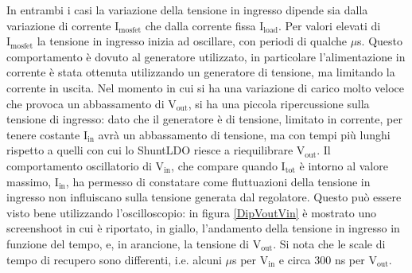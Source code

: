 In entrambi i casi la variazione della tensione in ingresso dipende sia dalla variazione di corrente $\mathrm{I_{mosfet}}$ che dalla corrente fissa $\mathrm{I_{load}}$. 
Per valori elevati di $\mathrm{I_{mosfet}}$ la tensione in ingresso inizia ad oscillare, con periodi di qualche $\mu$s.
Questo comportamento è dovuto al generatore utilizzato, in particolare l'alimentazione in corrente è stata ottenuta utilizzando un generatore di tensione, ma limitando la corrente in uscita. 
Nel momento in cui si ha una variazione di carico molto veloce che provoca un abbassamento di $\mathrm{V_{out}}$, si ha una piccola ripercussione sulla tensione di ingresso: dato che il generatore è di tensione, limitato in corrente, per tenere costante $\mathrm{I_{in}}$ avrà un abbassamento di tensione, ma con tempi più lunghi rispetto a quelli con cui lo ShuntLDO riesce a riequilibrare $\mathrm{V_{out}}$.
Il comportamento oscillatorio di $\mathrm{V_{in}}$, che compare quando $\mathrm{I_{tot}}$ è intorno al valore massimo, $\mathrm{I_{in}}$, ha permesso di constatare come fluttuazioni della tensione in ingresso non influiscano sulla tensione generata dal regolatore.
Questo può essere visto bene utilizzando l'oscilloscopio: in figura \ref{DipVoutVin} è mostrato uno screenshoot in cui è riportato, in giallo, l'andamento della tensione in ingresso in funzione del tempo, e, in arancione, la tensione di $\mathrm{V_{out}}$.
Si nota che le scale di tempo di recupero sono differenti, i.e. alcuni $\mu$s per $\mathrm{V_{in}}$ e circa 300 ns per $\mathrm{V_{out}}$.

